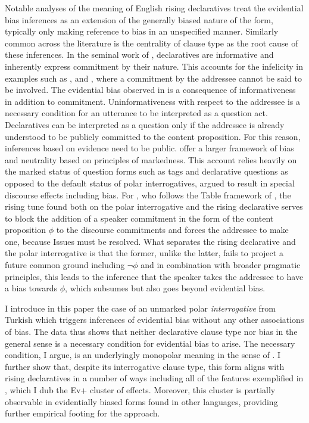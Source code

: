 \documentclass[output=paper,colorlinks,citecolor=brown]{langscibook}
\begin{document}
Notable analyses of the meaning of English rising declaratives treat the evidential bias inferences as an extension of the generally biased nature of the form, typically only making reference to bias in an unspecified manner. Similarly common across the literature is the centrality of clause type as the root cause of these inferences. In the seminal work of \citet{gunlogson}, declaratives are informative and inherently express commitment by their nature. This accounts for the infelicity in examples such as ,  and , where a commitment by the addressee cannot be said to be involved. The evidential bias observed in  is a consequence of informativeness in addition to commitment. Uninformativeness with respect to the addressee is a necessary condition for an utterance to be interpreted as a question act. Declaratives can be interpreted as a question only if the addressee is already understood to be publicly committed to the content proposition. For this reason, inferences based on evidence need to be public. \citet{farkas-roelofsen-division} offer a larger framework of bias and neutrality based on principles of markedness. This account relies heavily on the marked status of question forms such as tags and declarative questions as opposed to the default status of polar interrogatives, argued to result in special discourse effects including bias. For \citet{rudin-rd}, who follows the Table framework of \citet{farkas+bruce10}, the rising tune found both on the polar interrogative and the rising declarative serves to block the addition of a speaker commitment in the form of the content proposition $\phi$ to the discourse commitments and forces the addressee to make one, because Issues must be resolved. What separates the rising declarative and the polar interrogative is that the former, unlike the latter, fails to project a future common ground including $\neg\phi$ and in combination with broader pragmatic principles, this leads to the inference that the speaker takes the addressee to have a bias towards $\phi$, which subsumes but also goes beyond evidential bias.

I introduce in this paper the case of an unmarked polar \textit{interrogative} from Turkish which triggers inferences of evidential bias without any other associations of bias. The data thus shows that neither declarative clause type nor bias in the general sense is a necessary condition for evidential bias to arise. The necessary condition, I argue, is an underlyingly monopolar meaning in the sense of \citet{krifka15}. I further show that, despite its interrogative clause type, this form aligns with rising declaratives in a number of ways including all of the features exemplified in , which I dub the Ev+ cluster of effects. Moreover, this cluster is partially observable in evidentially biased forms found in other languages, providing further empirical footing for the approach.
\end{document}
